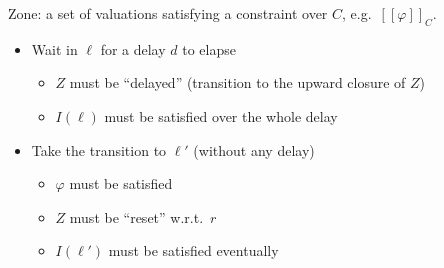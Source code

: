 \documentclass{beamer}
\theoremstyle{definition}
\begin{document}
\begin{frame}
  \small
  Zone: a set of valuations satisfying a constraint over $C$, e.g.\ $[\![\varphi]\!]_C$.
  \begin{center}
  \end{center}
  \begin{itemize}
    \item<2-> Wait in $\ell$ for a delay $d$ to elapse
    \begin{itemize}
      \item<4-> $Z$ must be ``delayed'' (transition to the upward closure of $Z$)
      \item<4-> $I(\ell)$ must be satisfied over the whole delay
    \end{itemize}
    \item<3-> Take the transition to $\ell'$ (without any delay)
    \begin{itemize}
      \item<5-> $\varphi$ must be satisfied
      \item<5-> $Z$ must be ``reset'' w.r.t.\ $r$
      \item<5-> $I(\ell')$ must be satisfied eventually
    \end{itemize}
  \end{itemize}
\end{frame}
\end{document}
